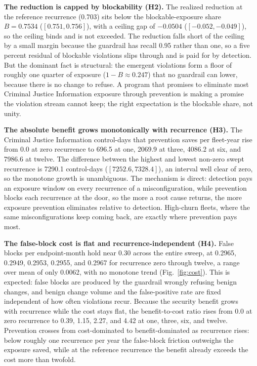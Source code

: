 \documentclass[journal]{IEEEtran}
\begin{document}
\textbf{The reduction is capped by blockability (H2).} The realized reduction at the reference
recurrence (0.703) sits below the blockable-exposure share $B = 0.7534$ ($[0.751, 0.756]$), with a
ceiling gap of $-0.0504$ ($[-0.052, -0.049]$), so the ceiling binds and is not exceeded. The
reduction falls short of the ceiling by a small margin because the guardrail has recall 0.95 rather
than one, so a five percent residual of blockable violations slips through and is paid for by
detection. But the dominant fact is structural: the emergent violations form a floor of roughly one
quarter of exposure ($1 - B \approx 0.247$) that no guardrail can lower, because there is no change
to refuse. A program that promises to eliminate most Criminal Justice Information exposure through
prevention is making a promise the violation stream cannot keep; the right expectation is the
blockable share, not unity.

\textbf{The absolute benefit grows monotonically with recurrence (H3).} The Criminal Justice
Information control-days that prevention saves per fleet-year rise from 0.0 at zero recurrence to
696.5 at one, 2069.9 at three, 4086.2 at six, and 7986.6 at twelve. The difference between the
highest and lowest non-zero swept recurrence is 7290.1 control-days ($[7252.6, 7328.4]$), an
interval well clear of zero, so the monotone growth is unambiguous. The mechanism is direct:
detection pays an exposure window on every recurrence of a misconfiguration, while prevention blocks
each recurrence at the door, so the more a root cause returns, the more exposure prevention
eliminates relative to detection. High-churn fleets, where the same misconfigurations keep coming
back, are exactly where prevention pays most.

\textbf{The false-block cost is flat and recurrence-independent (H4).} False blocks per
endpoint-month hold near 0.30 across the entire sweep, at 0.2965, 0.2949, 0.2953, 0.2955, and 0.2967
for recurrence zero through twelve, a range over mean of only 0.0062, with no monotone trend
(Fig.~\ref{fig:cost}). This is expected: false blocks are produced by the guardrail wrongly refusing
benign changes, and benign change volume and the false-positive rate are fixed independent of how
often violations recur. Because the security benefit grows with recurrence while the cost stays
flat, the benefit-to-cost ratio rises from 0.0 at zero recurrence to 0.39, 1.15, 2.27, and 4.42 at
one, three, six, and twelve. Prevention crosses from cost-dominated to benefit-dominated as
recurrence rises: below roughly one recurrence per year the false-block friction outweighs the
exposure saved, while at the reference recurrence the benefit already exceeds the cost more than
twofold.
\end{document}

